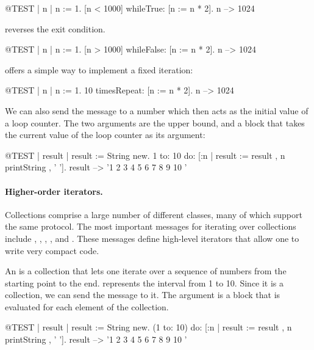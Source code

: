 \documentclass[a4paper,10pt,twoside]{book}
\begin{document}
\begin{code}{@TEST | n |}
n := 1.
[n < 1000] whileTrue: [n := n * 2].
n --> 1024
\end{code}

\noindent
{} reverses the exit condition.
\begin{code}{@TEST | n |}
n := 1.
[n > 1000] whileFalse: [n := n * 2].
n --> 1024
\end{code}

\noindent
{} offers a simple way to implement a fixed iteration:

\begin{code}{@TEST | n |}
n := 1.
10 timesRepeat: [n := n * 2].
n --> 1024
\end{code}

We can also send the message  to a number which then acts as the initial value of a loop counter.
The two arguments are the upper bound, and a block that takes the current value of the loop counter as its argument:

\begin{code}{@TEST | result |}
result := String new.
1 to: 10 do: [:n | result := result , n printString , ' '].
result --> '1 2 3 4 5 6 7 8 9 10 '
\end{code}

\paragraph{Higher-order iterators.}
Collections comprise a large number of different classes, many of which support the same protocol.
The most important messages for iterating over collections include
, , , ,  and .
These messages define high-level iterators that allow one to write very compact code.

An  is a collection that lets one iterate over a sequence of numbers from the starting point to the end.
 represents the interval from 1 to 10.
Since it is a collection, we can send the message  to it.
The argument is a block that is evaluated for each element of the collection.

\begin{code}{@TEST | result |}
result := String new.
(1 to: 10) do: [:n | result := result , n printString , ' '].
result --> '1 2 3 4 5 6 7 8 9 10 '
\end{code}
\end{document}
